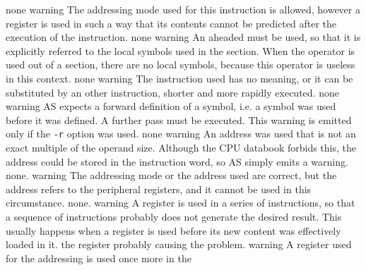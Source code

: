 \documentclass[12pt,twoside]{report}
\newcommand{\tty}[1]{{\tt #1}}
\newcommand{\asname}{{AS}}
\begin{document}
\begin{description}
               {none}
               {warning}
               {The addressing mode used for this instruction is allowed,
                however a register is used in such a way that its contents
                cannot be predicted after the execution of the
                instruction.}
               {none}
               {warning}
               {An aheaded \@ must be used, so that it is
                explicitly referred to the local symbols used in the
                section. When the operator is used out of a section, there
                are no local symbols, because this operator is useless in
                this context.}
               {none}
               {warning}
               {The instruction used has no meaning, or it can be
                substituted by an other instruction, shorter and more
                rapidly executed.}
               {none}
               {warning}
               {\asname{} expects a forward definition of a symbol, i.e. a symbol
                was used before it was defined. A further pass must be
                executed. This warning is emitted only if the \tty{-r} option was
                used.}
               {none}
               {warning}
               {An address was used that is not an exact multiple of the
                operand size. Although the CPU databook forbids this, the
                address could be stored in the instruction word, so \asname{}
                simply emits a warning.}
               {none.}
               {warning}
               {The addressing mode or the address used are correct, but the
                address refers to the peripheral registers, and it
                cannot be used in this circumstance.}
               {none.}
               {warning}
               {A register is used in a series of instructions, so that a
                sequence of instructions probably does not generate the
                desired result. This usually happens when a register is
                used before its new content was effectively loaded in it.}
               {the register probably causing the problem.}
               {warning}
               {A register used for the addressing is used once more in the
}
\end{description}
\end{document}
